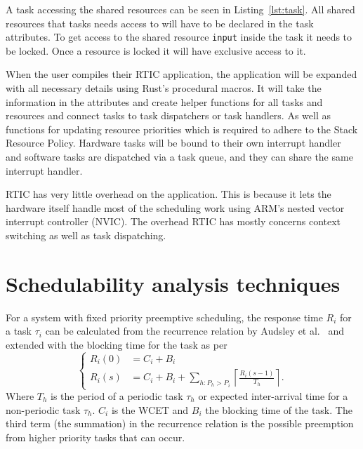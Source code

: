 A task accessing the shared resources can be seen in Listing~\ref{lst:task}.
All shared resources that tasks needs access to will have to be declared in the
task attributes. To get access to the shared resource \texttt{input} inside the
task it needs to be locked. Once a resource is locked it will have exclusive
access to it.


When the user compiles their RTIC application, the application will be expanded
with all necessary details using Rust's procedural macros. It will take the
information in the attributes and create helper functions for all tasks and
resources and connect tasks to task dispatchers or task handlers. As well as
functions for updating resource priorities which is required to adhere to the
Stack Resource Policy. Hardware tasks will be bound to their own interrupt handler
and software tasks are dispatched via a task queue, and they can share the same
interrupt handler.

RTIC has very little overhead on the application. This is because it lets the
hardware itself handle most of the scheduling work using ARM's nested vector
interrupt controller (NVIC). The overhead RTIC has mostly concerns context switching
as well as task dispatching.

\section{Schedulability analysis techniques}
\label{theory:schedulability}
For a system with fixed priority preemptive scheduling, the response time $R_i$
for a task $\tau_i$ can be calculated from the recurrence relation by Audsley
et al.\ \cite{audsley93} and extended with the blocking time for the task as
per\cite{hardrealtimecomputingsystems}
\begin{equation}
    \begin{cases}
        R_{i}(0) &= C_i + B_i \\
        R_{i}(s) &= C_i + B_i + \sum\limits_{h: P_h > P_i} \left\lceil \frac{R_{i}(s-1)}{T_h} \right\rceil.
    \end{cases}
\end{equation}
Where $T_h$ is the period of a periodic task $\tau_h$ or expected inter-arrival
time for a non-periodic task $\tau_h$. $C_i$ is the WCET and $B_i$ the blocking
time of the task. The third term (the summation) in the recurrence relation is
the possible preemption from higher priority tasks that can occur.

